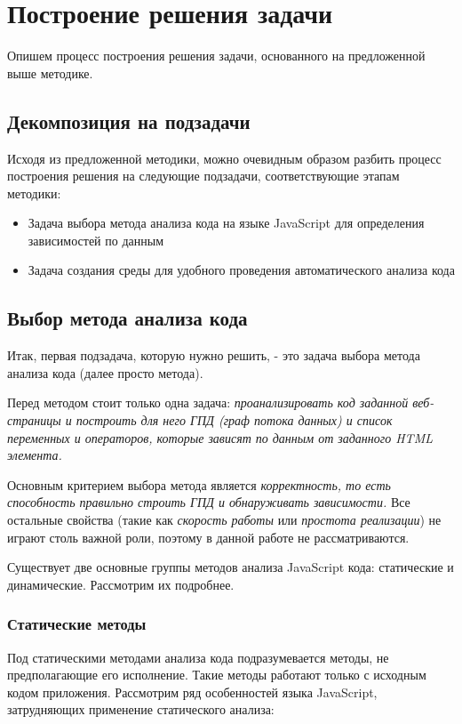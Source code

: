 
\chapter{Построение решения задачи}\label{Solution}
Опишем процесс построения решения задачи, основанного на предложенной выше методике.

\section{Декомпозиция на подзадачи}
Исходя из предложенной методики, можно очевидным образом разбить процесс построения решения на следующие подзадачи, соответствующие этапам методики:

\begin{itemize}
	\item Задача выбора метода анализа кода на языке JavaScript для определения зависимостей по данным
	\item Задача создания среды для удобного проведения автоматического анализа кода
\end{itemize}

\section{Выбор метода анализа кода}

Итак, первая подзадача, которую нужно решить, - это задача выбора метода анализа кода (далее просто метода). 

\bigskip
Перед методом стоит только одна задача: \textit{проанализировать код заданной веб-страницы и построить для него ГПД (граф потока данных) и список переменных и операторов, которые зависят по данным от заданного HTML элемента.}

\bigskip
Основным критерием выбора метода является \textit{корректность, то есть способность правильно строить ГПД и обнаруживать зависимости.} Все остальные свойства (такие как \textit{скорость работы} или \textit{простота реализации}) не играют столь важной роли, поэтому в данной работе не рассматриваются.

\bigskip
Существует две основные группы методов анализа JavaScript кода: статические и динамические. Рассмотрим их подробнее.

\subsection{Статические методы}
	Под статическими методами анализа кода подразумевается методы, не предполагающие его исполнение. Такие методы работают только с исходным кодом приложения. Рассмотрим ряд особенностей языка JavaScript, затрудняющих применение статического анализа:


